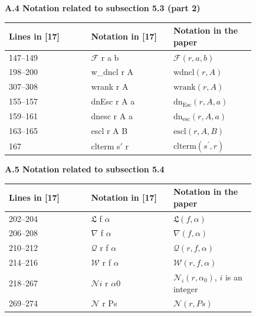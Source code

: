 
 
 
\par\medskip\noindent\textbf{A.4 Notation related to subsection 5.3 (part 2)}\par
 
 
\begin{longtable}{|p{0.27666666666666667\linewidth}|p{0.27666666666666667\linewidth}|p{0.27666666666666667\linewidth}|}\hline
Lines in [17] & Notation in [17] & Notation in the paper \\ \hline
147–149 & $\mathcal{F}$ r a b & $\mathcal{F}(r,a,b)$ \\ \hline
198–200 & w\_dncl r A & $\mathrm{wdncl}(r,A)$ \\ \hline
307–308 & wrank r A & $\mathrm{wrank}(r,A)$ \\ \hline
155–157 & dnEsc r A a & $\mathrm{dn_{Esc}}(r,A,a)$ \\ \hline
159–161 & dnesc r A a & $\mathrm{dn_{esc}}(r,A,a)$ \\ \hline
163–165 & escl r A B & $\mathrm{escl}(r,A,B)$ \\ \hline
167 & clterm s\ensuremath{\prime} r & $\mathrm{clterm}(s^{\prime},r)$ \\ \hline
\end{longtable}
 
 
 
 
\par\medskip\noindent\textbf{A.5 Notation related to subsection 5.4}\par
 
 
\begin{longtable}{|p{0.27666666666666667\linewidth}|p{0.27666666666666667\linewidth}|p{0.27666666666666667\linewidth}|}\hline
Lines in [17] & Notation in [17] & Notation in the paper \\ \hline
202–204 & $\mathfrak{L}$ f $\alpha$ & $\mathfrak{L}(f,\alpha)$ \\ \hline
206–208 & $\nabla$ f $\alpha$ & $\nabla(f,\alpha)$ \\ \hline
210–212 & $\mathcal{Q}$ r f $\alpha$ & $\mathcal{Q}(r,f,\alpha)$ \\ \hline
214–216 & $\mathcal{W}$ r f $\alpha$ & $\mathcal{W}(r,f,\alpha)$ \\ \hline
218–267 & $\mathcal{N}i$ r $\alpha 0$ & $\mathcal{N}_{i}(r,\alpha_{0})$, $i$ is an integer \\ \hline
269–274 & $\mathcal{N}$ r Ps & $\mathcal{N}(r,Ps)$ \\ \hline
\end{longtable}
 
 
 
